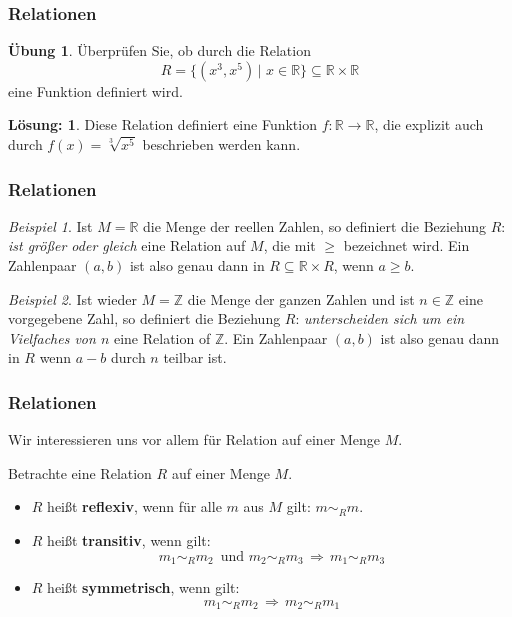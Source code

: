 \documentclass[hyperref={pdfpagelabels=false}]{beamer}
\theoremstyle{plain}%
\theoremstyle{definition}
\newtheorem*{uebung}{Übung}
\newtheorem*{sol}{Lösung:}
\theoremstyle{remark}
\newtheorem*{beispiel}{Beispiel}
\def \R{\mathbb R}
\begin{document}
\begin{frame}
\frametitle{Relationen}

\begin{uebung}
Überprüfen Sie, ob durch die Relation 
	$$ R = \{ (x^3, x^5) \, \vert \, \, x \in \mathbb R \} \subseteq \R \times \R $$
eine Funktion definiert wird. 
\end{uebung}

\pause \pause 

\begin{sol}
Diese Relation definiert eine Funktion $f: \R \longrightarrow \R$, die explizit auch durch 
$f(x) = \sqrt[3]{x^5}$ beschrieben werden kann. 
\end{sol}
\end{frame}

\begin{frame}
\frametitle{Relationen}

\begin{beispiel}\label{relation_geq} Ist $M = \R$ die Menge der reellen Zahlen, so definiert die 
Beziehung $R$: \textit{ist größer oder gleich} eine Relation auf $M$, die mit $\geq$ bezeichnet wird. 
Ein Zahlenpaar $(a,b)$ ist also genau dann in $R \subseteq \R \times R$, wenn $a \geq b$.
\end{beispiel}

\pause

\begin{beispiel}\label{relation_modn} Ist wieder $M = \mathbb Z$ die Menge der ganzen Zahlen und ist $n \in 
\mathbb Z$ eine vorgegebene Zahl, so definiert die Beziehung $R$: \textit{unterscheiden sich um ein 
Vielfaches von $n$} eine Relation of $\mathbb Z$. Ein Zahlenpaar $(a,b)$ ist also genau dann in $R$ wenn $a - b$ 
durch $n$ teilbar ist.
\end{beispiel}

\end{frame}

\begin{frame}
\frametitle{Relationen}

Wir interessieren uns vor allem für Relation auf einer Menge $M$.
\bigbreak

\pause 
\begin{definition} Betrachte eine Relation $R$ auf einer Menge $M$.

\begin{itemize} 
\item<3-> $R$ heißt \textbf{reflexiv}, wenn für alle $m$ aus $M$ gilt: $m \sim_R m$.
\item<4-> $R$ heißt \textbf{transitiv}, wenn gilt: 
   	$$ m_1 \sim_R m_2 \, \textrm{ und } m_2 \sim_R m_3 \, \Longrightarrow \, m_1 \sim_R m_3 $$
\item<5-> $R$ heißt \textbf{symmetrisch}, wenn gilt:
   	$$ m_1 \sim_R m_2 \, \Longrightarrow \, m_2 \sim_R m_1 $$
\end{itemize}
\end{definition}


\end{frame}
\end{document}
